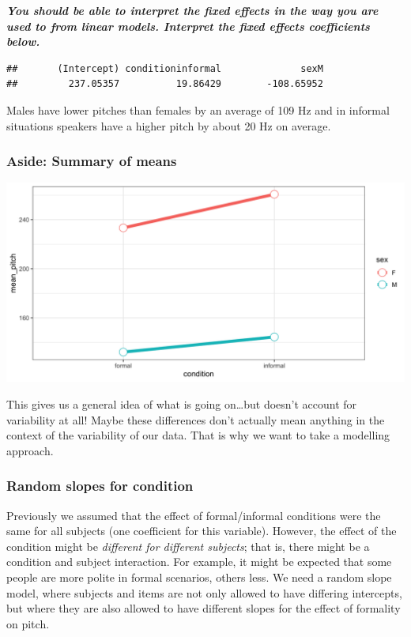 \documentclass[
  openany]{book}
\begin{document}
\textbf{\emph{You should be able to interpret the fixed effects in the way you are used to from linear models. Interpret the fixed effects coefficients below.}}

\begin{verbatim}
##       (Intercept) conditioninformal              sexM 
##         237.05357          19.86429        -108.65952
\end{verbatim}

Males have lower pitches than females by an average of 109 Hz and in informal situations speakers have a higher pitch by about 20 Hz on average.

\hypertarget{aside-summary-of-means}{%
\subsubsection{Aside: Summary of means}\label{aside-summary-of-means}}

\includegraphics[width=9.1\linewidth]{images/m3/aside}

This gives us a general idea of what is going on\ldots but doesn't account for variability at all! Maybe these differences don't actually mean anything in the context of the variability of our data. That is why we want to take a modelling approach.

\hypertarget{random-slopes-for-condition}{%
\subsubsection{Random slopes for condition}\label{random-slopes-for-condition}}

Previously we assumed that the effect of formal/informal conditions were the same for all subjects (one coefficient for this variable). However, the effect of the condition might be \emph{different for different subjects}; that is, there might be a condition and subject interaction. For example, it might be expected that some people are more polite in formal scenarios, others less. We need a random slope model, where subjects and items are not only allowed to have differing intercepts, but where they are also allowed to have different slopes for the effect of formality on pitch.
\end{document}
